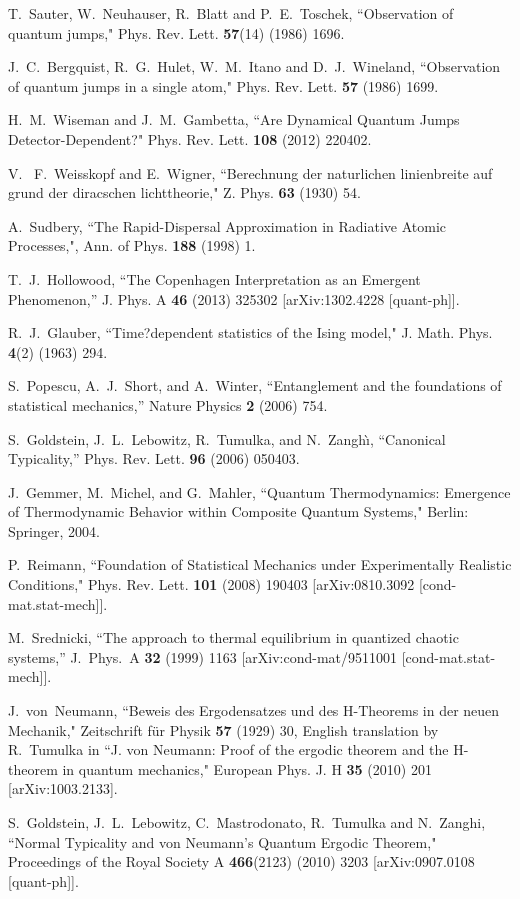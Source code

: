 \documentclass[12pt]{article}
\theoremstyle{plain}
\theoremstyle{definition}
\theoremstyle{remark}
\begin{document}
\begin{thebibliography}{99}
T.~Sauter, W.~Neuhauser, R.~Blatt and P.~E.~Toschek, ``Observation of quantum jumps,"   Phys. Rev. Lett. {\bf57}(14) (1986) 1696.

J.~C.~Bergquist, R.~G.~Hulet, W.~M.~Itano and D.~J.~Wineland, ``Observation of quantum jumps in a single atom,"   Phys. Rev. Lett. {\bf 57} (1986) 1699.


H.~M.~Wiseman and J.~M.~Gambetta, ``Are Dynamical Quantum Jumps Detector-Dependent?" 
 Phys. Rev. Lett. {\bf 108} (2012) 220402.

V. ~F.~Weisskopf and E.~Wigner, ``Berechnung der naturlichen linienbreite auf grund der diracschen lichttheorie,"  Z. Phys. {\bf63} (1930) 54. 
 
A.~Sudbery, ``The Rapid-Dispersal Approximation in Radiative Atomic Processes,", Ann. of Phys. {\bf188} (1998) 1.


  T.~J.~Hollowood,
  ``The Copenhagen Interpretation as an Emergent Phenomenon,''
  J. Phys. A {\bf 46} (2013) 325302
  [arXiv:1302.4228 [quant-ph]].



R.~J.~Glauber, ``Time?dependent statistics of the Ising model," J. Math. Phys. {\bf4}(2) (1963) 294.



S.~Popescu, A.~J.~Short, and A.~Winter,
   ``Entanglement and the foundations of statistical mechanics,''
   Nature Physics {\bf2} (2006) 754.


S.~Goldstein, J.~L.~Lebowitz, R.~Tumulka, and N.~Zangh\`\i, ``Canonical Typicality,''
   Phys. Rev. Lett.  {\bf 96} (2006) 050403.

J.~Gemmer, M.~Michel, and G.~Mahler, 
``Quantum Thermodynamics: Emergence of Thermodynamic Behavior within Composite Quantum Systems," Berlin: Springer, 2004.  


P.~Reimann, ``Foundation of Statistical Mechanics under Experimentally Realistic Conditions," Phys. Rev. Lett. {\bf 101} (2008) 190403 [arXiv:0810.3092 [cond-mat.stat-mech]].


  M.~Srednicki,
  ``The approach to thermal equilibrium in quantized chaotic systems,''
  J.\ Phys.\ A {\bf 32} (1999) 1163
  [arXiv:cond-mat/9511001  [cond-mat.stat-mech]].


J.~von~Neumann, ``Beweis des Ergodensatzes und des H-Theorems in der neuen Mechanik," Zeitschrift f\"ur Physik {\bf 57} (1929) 30, English translation by R.~Tumulka in ``J. von Neumann: Proof of the ergodic theorem and the H- theorem in quantum mechanics," European Phys. J. H {\bf 35} (2010) 201 [arXiv:1003.2133].


S.~Goldstein, J.~L.~Lebowitz, C.~Mastrodonato, R.~Tumulka and N.~Zanghi, ``Normal Typicality and von Neumann's Quantum Ergodic Theorem," Proceedings of the Royal Society A {\bf 466}(2123) (2010) 3203 [arXiv:0907.0108 [quant-ph]].


\end{thebibliography}
\end{document}
